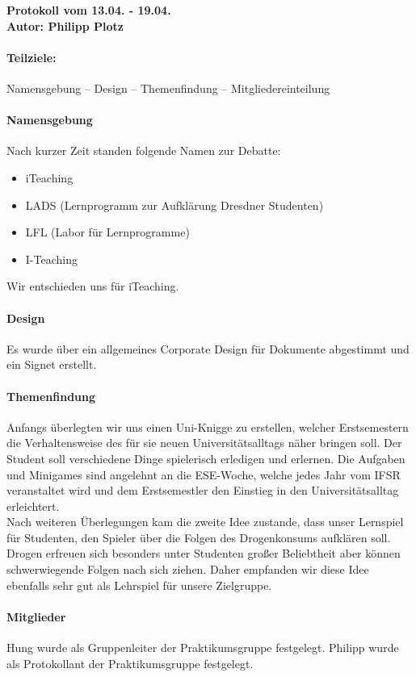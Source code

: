 \documentclass[a4paper,10pt]{article}
\begin{document}
{\bfseries \large Protokoll vom 13.04. - 19.04. \\[1mm]		%
\normalfont Autor: Philipp Plotz}					%


\paragraph{Teilziele:}								%
Namensgebung – Design – Themenfindung – Mitgliedereinteilung


\paragraph{Namensgebung}
Nach kurzer Zeit standen folgende Namen zur Debatte:
\begin{itemize}
	\item iTeaching
	\item LADS (Lernprogramm zur Aufklärung Dresdner Studenten)
	\item LFL (Labor für Lernprogramme)
	\item I-Teaching
\end{itemize}
Wir entschieden uns für iTeaching.

\paragraph{Design}
Es wurde über ein allgemeines Corporate Design für Dokumente abgestimmt und ein Signet erstellt.

\paragraph{Themenfindung}
Anfangs überlegten wir uns einen \glqq Uni-Knigge \grqq zu erstellen, welcher Erstsemestern die Verhaltensweise des für sie neuen Universitätsalltags näher bringen soll. Der Student soll verschiedene Dinge spielerisch erledigen und erlernen. Die Aufgaben und Minigames sind angelehnt an die ESE-Woche, welche jedes Jahr vom IFSR veranstaltet wird und dem Erstsemestler den Einstieg in den Universitätsalltag erleichtert. \\
Nach weiteren Überlegungen kam die zweite Idee zustande, dass unser Lernspiel für Studenten, den Spieler über die Folgen des Drogenkonsums aufklären soll. Drogen erfreuen sich besonders unter Studenten großer Beliebtheit aber können schwerwiegende Folgen nach sich ziehen. Daher empfanden wir diese Idee ebenfalls sehr gut als Lehrspiel für unsere Zielgruppe.

\paragraph{Mitglieder}
Hung wurde als Gruppenleiter der Praktikumsgruppe festgelegt.
Philipp wurde als Protokollant der Praktikumsgruppe festgelegt.
\end{document}
